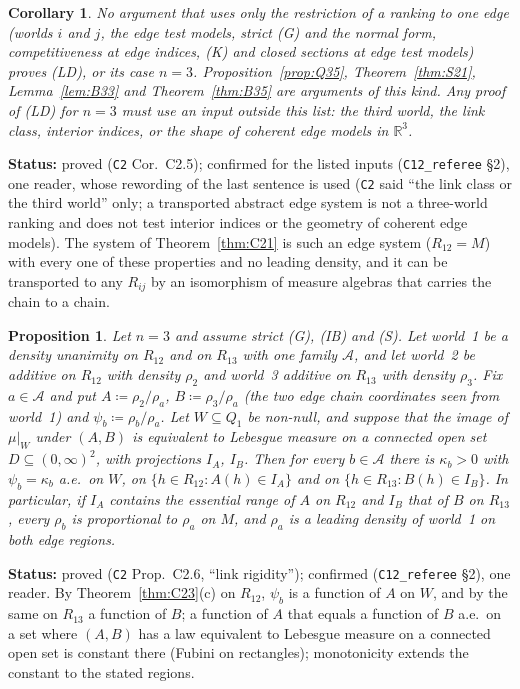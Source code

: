 \documentclass[11pt]{article}
\newtheorem{proposition}[theorem]{Proposition}
\newtheorem{corollary}[theorem]{Corollary}
\theoremstyle{definition}
\theoremstyle{remark}
\newcommand{\R}{\mathbb R}
\newcommand{\src}[1]{\texttt{#1}}
\newcommand{\status}[1]{\par\smallskip\noindent\textbf{Status:} #1\par\smallskip}
\begin{document}
\begin{corollary}\label{cor:C25}
No argument that uses only the restriction of a ranking to one edge (worlds $i$ and $j$, the edge test models, strict (G) and the normal form, competitiveness at edge indices, (K) and closed sections at edge test models) proves (LD), or its case $n=3$. Proposition~\ref{prop:Q35}, Theorem~\ref{thm:S21}, Lemma~\ref{lem:B33} and Theorem~\ref{thm:B35} are arguments of this kind. Any proof of (LD) for $n=3$ must use an input outside this list: the third world, the link class, interior indices, or the shape of coherent edge models in $\R^3$.
\end{corollary}
\status{proved (\src{C2} Cor.~C2.5); confirmed for the listed inputs (\src{C12\_referee} \S2), one reader, whose rewording of the last sentence is used (\src{C2} said ``the link class or the third world'' only; a transported abstract edge system is not a three-world ranking and does not test interior indices or the geometry of coherent edge models). The system of Theorem~\ref{thm:C21} is such an edge system ($R_{12}=M$) with every one of these properties and no leading density, and it can be transported to any $R_{ij}$ by an isomorphism of measure algebras that carries the chain to a chain.}

\begin{proposition}\label{prop:C26}
Let $n=3$ and assume strict (G), (IB) and (S). Let world~1 be a density unanimity on $R_{12}$ and on $R_{13}$ with one family $\mathcal A$, and let world~2 be additive on $R_{12}$ with density $\rho_2$ and world~3 additive on $R_{13}$ with density $\rho_3$. Fix $a\in\mathcal A$ and put $A\coloneqq\rho_2/\rho_a$, $B\coloneqq\rho_3/\rho_a$ (the two edge chain coordinates seen from world~1) and $\psi_b\coloneqq\rho_b/\rho_a$. Let $W\subseteq Q_1$ be non-null, and suppose that the image of $\mu|_W$ under $(A,B)$ is equivalent to Lebesgue measure on a connected open set $D\subseteq(0,\infty)^2$, with projections $I_A$, $I_B$. Then for every $b\in\mathcal A$ there is $\kappa_b>0$ with $\psi_b=\kappa_b$ a.e.\ on $W$, on $\{h\in R_{12}:A(h)\in I_A\}$ and on $\{h\in R_{13}:B(h)\in I_B\}$. In particular, if $I_A$ contains the essential range of $A$ on $R_{12}$ and $I_B$ that of $B$ on $R_{13}$, every $\rho_b$ is proportional to $\rho_a$ on $M$, and $\rho_a$ is a leading density of world~1 on both edge regions.
\end{proposition}
\status{proved (\src{C2} Prop.~C2.6, ``link rigidity''); confirmed (\src{C12\_referee} \S2), one reader. By Theorem~\ref{thm:C23}(c) on $R_{12}$, $\psi_b$ is a function of $A$ on $W$, and by the same on $R_{13}$ a function of $B$; a function of $A$ that equals a function of $B$ a.e.\ on a set where $(A,B)$ has a law equivalent to Lebesgue measure on a connected open set is constant there (Fubini on rectangles); monotonicity extends the constant to the stated regions.}
\end{document}
